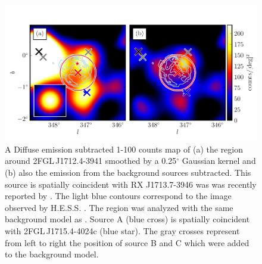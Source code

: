 \documentclass[12pt,preprint]{aastex}
\newcommand{\gev}{\text{GeV}\xspace}
\newcommand{\tev}{\text{TeV}\xspace}
\renewcommand{\deg}{\ensuremath{^\circ}\xspace}
\begin{document}
\begin{figure}
  \begin{center}
    \includegraphics[type=pdf,ext=.pdf,read=.pdf]{source_plots/source_RX_J1713.7-3946}
  \end{center}
  \caption{A Diffuse emission subtracted 1-100 \gev
  counts map of (a) the region around 2FGL\,J1712.4-3941 smoothed by
  a 0.25\deg Gaussian kernel and (b) also the emission 
  from the background sources subtracted.
  This source is spatially
  coincident with RX J1713.7-3946 was was recently reported by
  \citep{rx_j1713_lat}.  The light blue contours correspond to the \tev image
  observed by H.E.S.S. \citep{rx_j1713_hess}.  The region was analyzed
  with the same background model as \citep{rx_j1713_lat}.  Source A (blue
  cross) is spatially coincident with 2FGL\,J1715.4-4024c (blue star).
  The gray crosses represent from left to right the position of source B
  and C which were added to the background model. 
  }\label{2FGL_J1712.4-3941}
\end{figure}
\end{document}
